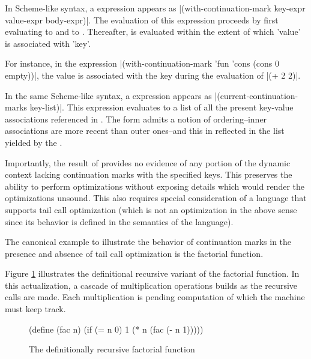 \documentclass[ms,electronic,twosidetoc,letterpaper,chaptercenter,parttop]{byumsphd}
\begin{document}
In Scheme-like syntax, a  expression appears as
\scheme|(with-continuation-mark key-expr value-expr body-expr)|. The evaluation of this
expression proceeds by first evaluating  to  and
 to . Thereafter,  is evaluated within
the extent of which \scheme'value' is associated with \scheme 'key'.

For instance, in the expression \scheme|(with-continuation-mark 'fun 'cons (cons 0
empty))|, the value  is associated with the key  during the
evaluation of \scheme|(+ 2 2)|.

In the same Scheme-like syntax, a  expression appears
as \scheme|(current-continuation-marks key-list)|. This expression evaluates to a list of
all the present key-value associations referenced in . The
 form admits a notion of ordering--inner associations are
more recent than outer ones--and this in reflected in the list yielded by the
.

Importantly, the result of  provides no evidence of any
portion of the dynamic context lacking continuation marks with the specified keys. This
preserves the ability to perform optimizations without exposing details which would render
the optimizations unsound. This also requires special consideration of a language that
supports tail call optimization (which is not an optimization in the above sense since its
behavior is defined in the semantics of the language).

The canonical example to illustrate the behavior of continuation marks in the presence and
absence of tail call optimization is the factorial function.

Figure \ref{fac-rec} illustrates the definitional recursive variant of the factorial
function. In this actualization, a cascade of multiplication operations builds as the
recursive calls are made. Each multiplication is pending computation of which the machine 
must keep track.

\begin{figure}
\begin{schemedisplay}
(define (fac n)
  (if (= n 0)
      1
      (* n (fac (- n 1)))))
\end{schemedisplay}
\caption{The definitionally recursive factorial function}
\label{fac-rec}
\end{figure}
\end{document}
